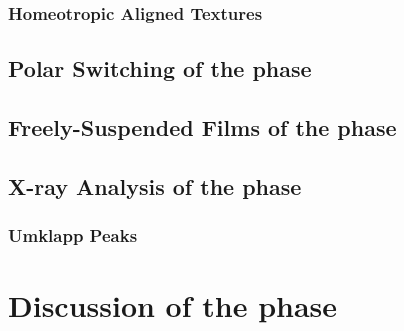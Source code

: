 \documentclass[defaultstyle,11pt]{article}
\begin{document}
\subsubsection{Homeotropic Aligned Textures}

\subsection{Polar Switching of the \smcpalpha{} phase}
\subsection{Freely-Suspended Films of the \smcpalpha{} phase}
\subsection{X-ray Analysis of the \smcpalpha{} phase}
\subsubsection{Umklapp Peaks}
\section{Discussion of the \smcpalpha{} phase}




%
\end{document}
